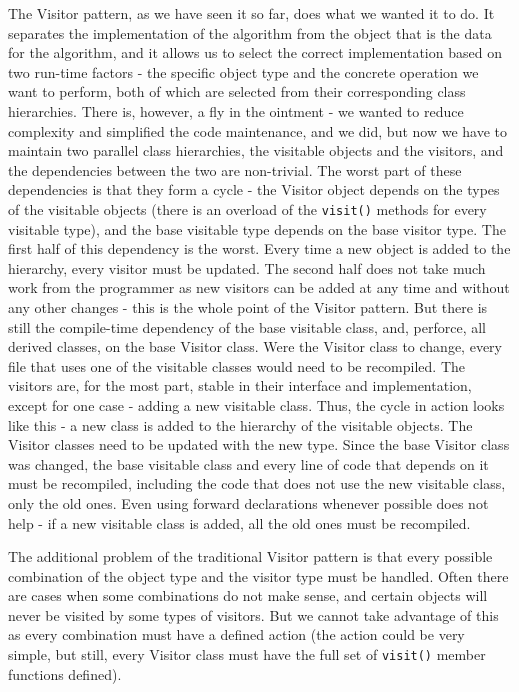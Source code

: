 The Visitor pattern, as we have seen it so far, does what we wanted it to do. It separates the implementation of the algorithm from the object that is the data for the algorithm, and it allows us to select the correct implementation based on two run-time factors - the specific object type and the concrete operation we want to perform, both of which are selected from their corresponding class hierarchies. There is, however, a fly in the ointment - we wanted to reduce complexity and simplified the code maintenance, and we did, but now we have to maintain two parallel class hierarchies, the visitable objects and the visitors, and the dependencies between the two are non-trivial. The worst part of these dependencies is that they form a cycle - the Visitor object depends on the types of the visitable objects (there is an overload of the \texttt{visit()} methods for every visitable type), and the base visitable type depends on the base visitor type. The first half of this dependency is the worst. Every time a new object is added to the hierarchy, every visitor must be updated. The second half does not take much work from the programmer as new visitors can be added at any time and without any other changes - this is the whole point of the Visitor pattern. But there is still the compile-time dependency of the base visitable class, and, perforce, all derived classes, on the base Visitor class. Were the Visitor class to change, every file that uses one of the visitable classes would need to be recompiled. The visitors are, for the most part, stable in their interface and implementation, except for one case - adding a new visitable class. Thus, the cycle in action looks like this - a new class is added to the hierarchy of the visitable objects. The Visitor classes need to be updated with the new type. Since the base Visitor class was changed, the base visitable class and every line of code that depends on it must be recompiled, including the code that does not use the new visitable class, only the old ones. Even using forward declarations whenever possible does not help - if a new visitable class is added, all the old ones must be recompiled.

The additional problem of the traditional Visitor pattern is that every possible combination of the object type and the visitor type must be handled. Often there are cases when some combinations do not make sense, and certain objects will never be visited by some types of visitors. But we cannot take advantage of this as every combination must have a defined action (the action could be very simple, but still, every Visitor class must have the full set of \texttt{visit()} member functions defined).

